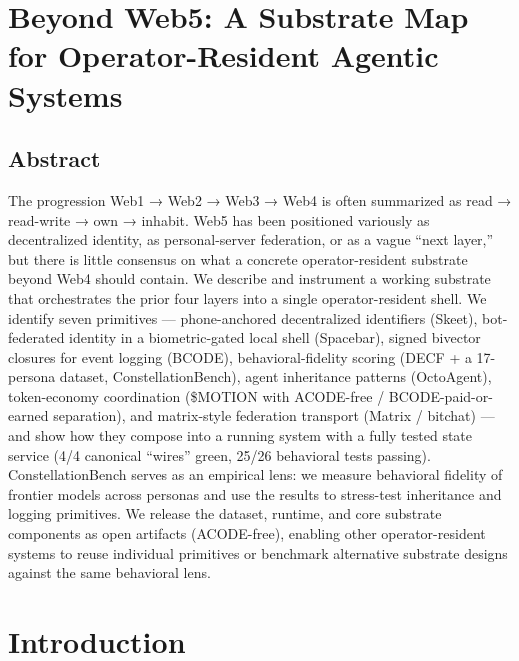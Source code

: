 \section{Beyond Web5: A Substrate Map for Operator-Resident Agentic
Systems}\label{beyond-web5-a-substrate-map-for-operator-resident-agentic-systems}

\subsection{Abstract}\label{abstract}

The progression Web1 → Web2 → Web3 → Web4 is often summarized as read →
read-write → own → inhabit. Web5 has been positioned variously as
decentralized identity, as personal-server federation, or as a vague
``next layer,'' but there is little consensus on what a concrete
operator-resident substrate beyond Web4 should contain. We describe and
instrument a working substrate that orchestrates the prior four layers
into a single operator-resident shell. We identify seven primitives ---
phone-anchored decentralized identifiers (Skeet), bot-federated identity
in a biometric-gated local shell (Spacebar), signed bivector closures
for event logging (BCODE), behavioral-fidelity scoring (DECF + a
17-persona dataset, ConstellationBench), agent inheritance patterns
(OctoAgent), token-economy coordination (\$MOTION with ACODE-free /
BCODE-paid-or-earned separation), and matrix-style federation transport
(Matrix / bitchat) --- and show how they compose into a running system
with a fully tested state service (4/4 canonical ``wires'' green, 25/26
behavioral tests passing). ConstellationBench serves as an empirical
lens: we measure behavioral fidelity of frontier models across personas
and use the results to stress-test inheritance and logging primitives.
We release the dataset, runtime, and core substrate components as open
artifacts (ACODE-free), enabling other operator-resident systems to
reuse individual primitives or benchmark alternative substrate designs
against the same behavioral lens.

\section{Introduction}\label{introduction}

